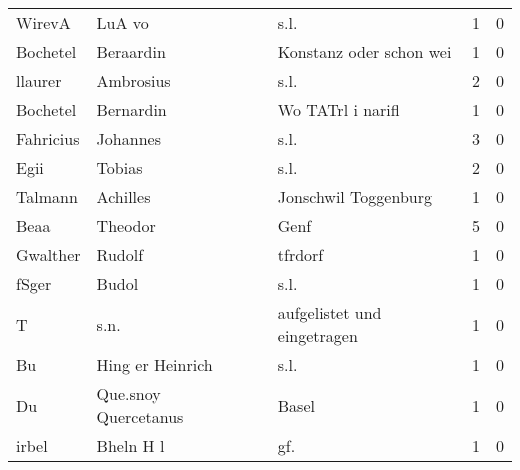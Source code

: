 \documentclass[10pt,a4paper,landscape]{article}
\begin{document}
\begin{longtable}{llllrr}
                   WirevA &                             LuA vo &             &                                        s.l. &          1 &         0 \\
                 Bochetel &                          Beraardin &             &                     Konstanz oder schon wei &          1 &         0 \\
                  llaurer &                          Ambrosius &             &                                        s.l. &          2 &         0 \\
                 Bochetel &                          Bernardin &             &                           Wo TATrl i narifl &          1 &         0 \\
                Fahricius &                           Johannes &             &                                        s.l. &          3 &         0 \\
                     Egii &                             Tobias &             &                                        s.l. &          2 &         0 \\
                  Talmann &                           Achilles &             &                        Jonschwil Toggenburg &          1 &         0 \\
                     Beaa &                            Theodor &             &                                        Genf &          5 &         0 \\
                 Gwalther &                             Rudolf &             &                                     tfrdorf &          1 &         0 \\
                    fSger &                              Budol &             &                                        s.l. &          1 &         0 \\
                        T &                               s.n. &             &                 aufgelistet und eingetragen &          1 &         0 \\
                       Bu &                   Hing er Heinrich &             &                                        s.l. &          1 &         0 \\
                       Du &               Que.snoy Quercetanus &             &                                       Basel &          1 &         0 \\
                    irbel &                          Bheln H l &             &                                        gf.  &          1 &         0 \\

\end{longtable}
\end{document}
